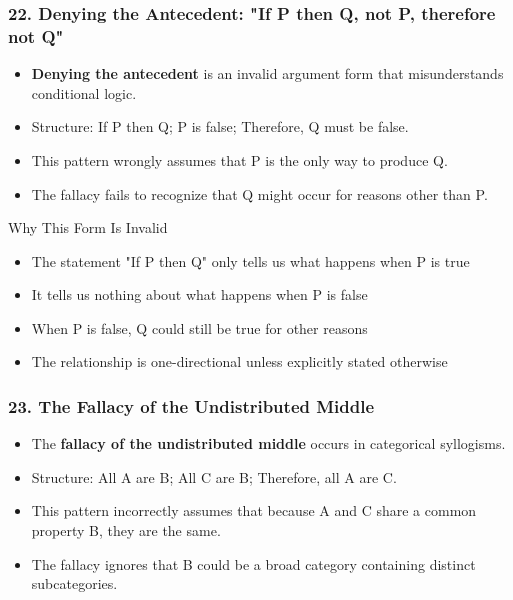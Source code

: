 \documentclass{beamer}
\begin{document}
\begin{frame}
\frametitle{22. Denying the Antecedent: "If P then Q, not P, therefore not Q"}
\begin{itemize}
\item \textbf{Denying the antecedent} is an invalid argument form that misunderstands conditional logic.
\item Structure: If P then Q; P is false; Therefore, Q must be false.
\item This pattern wrongly assumes that P is the only way to produce Q.
\item The fallacy fails to recognize that Q might occur for reasons other than P.
\end{itemize}

\begin{block}{Why This Form Is Invalid}
\begin{itemize}
\item The statement "If P then Q" only tells us what happens when P is true
\item It tells us nothing about what happens when P is false
\item When P is false, Q could still be true for other reasons
\item The relationship is one-directional unless explicitly stated otherwise
\end{itemize}
\end{block}
\end{frame}

\begin{frame}
\frametitle{23. The Fallacy of the Undistributed Middle}
\begin{itemize}
\item The \textbf{fallacy of the undistributed middle} occurs in categorical syllogisms.
\item Structure: All A are B; All C are B; Therefore, all A are C.
\item This pattern incorrectly assumes that because A and C share a common property B, they are the same.
\item The fallacy ignores that B could be a broad category containing distinct subcategories.
\end{itemize}

\end{frame}
\end{document}

